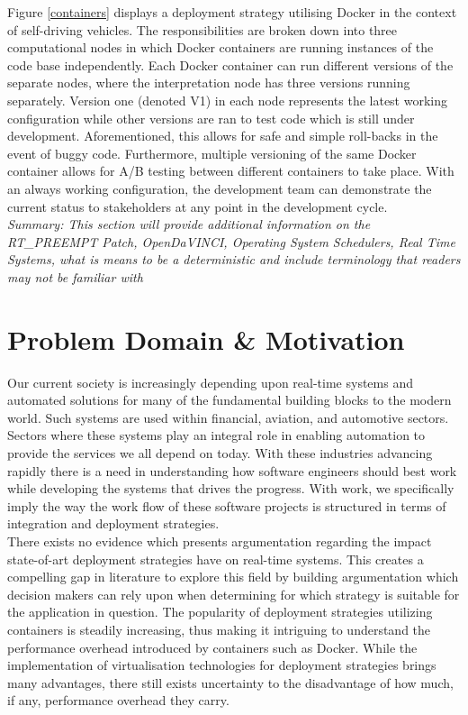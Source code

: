 Figure \ref{containers} displays a deployment strategy utilising Docker in the context of self-driving vehicles. The responsibilities are broken down into three computational nodes in which Docker containers are running instances of the code base independently. Each Docker container can run different versions of the separate nodes, where the interpretation node has three versions running separately. Version one (denoted V1) in each node represents the latest working configuration while other versions are ran to test code which is still under development. Aforementioned, this allows for safe and simple roll-backs in the event of buggy code. Furthermore, multiple versioning of the same Docker container allows for A/B testing between different containers to take place. With an always working configuration, the development team can demonstrate the current status to stakeholders at any point in the development cycle. \\

\textit{Summary: This section will provide additional information on the RT\_PREEMPT Patch, OpenDaVINCI, Operating System Schedulers, Real Time Systems,  what is means to be a deterministic and include terminology that readers may not be familiar with}



\section{Problem Domain \& Motivation}
Our current society is increasingly depending upon real-time systems and automated solutions for many of the fundamental building blocks to the modern world. Such systems are used within financial, aviation, and automotive sectors. Sectors where these systems play an integral role in enabling automation to provide the services we all depend on today. With these industries advancing rapidly there is a need in understanding how software engineers should best work while developing the systems that drives the progress. With work, we specifically imply the way the work flow of these software projects is structured in terms of integration and deployment strategies.\\

There exists no evidence which presents argumentation regarding the impact state-of-art deployment strategies have on real-time systems. This creates a compelling gap in literature to explore this field by building argumentation which decision makers can rely upon when determining for which strategy is suitable for the application in question. The popularity of deployment strategies utilizing containers is steadily increasing, thus making it intriguing to understand the performance overhead introduced by containers such as Docker. While the implementation of virtualisation technologies for deployment strategies brings many advantages, there still exists uncertainty to the disadvantage of how much, if any, performance overhead they carry.\\

